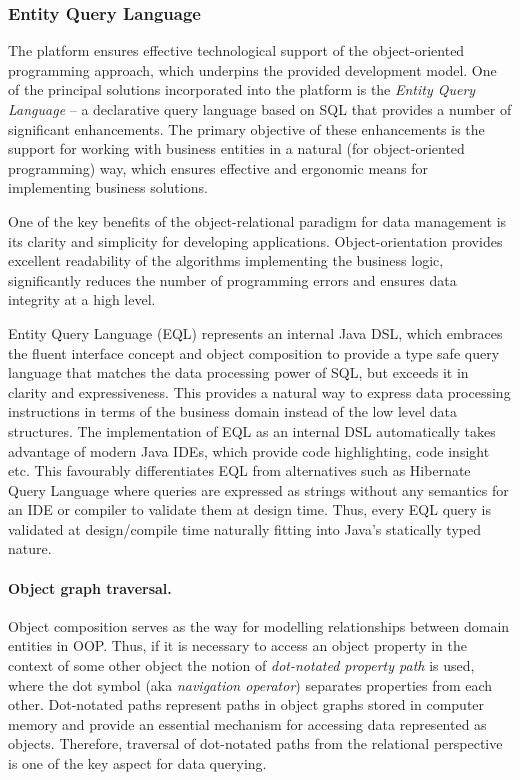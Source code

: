    \subsubsection{Entity Query Language}  
  The platform ensures effective technological support of the object-oriented programming approach, which underpins the provided development model.
  One of the principal solutions incorporated into the platform is the \emph{Entity Query Language} -- a declarative query language based on SQL that provides a number of significant enhancements. 
  The primary objective of these enhancements is the support for working with business entities in a natural (for object-oriented programming) way, which ensures effective and ergonomic means for implementing business solutions.
  
  One of the key benefits of the object-relational paradigm for data management is its clarity and simplicity for developing applications.
  Object-orientation provides excellent readability of the algorithms implementing the business logic, significantly reduces the number of programming errors and ensures data integrity at a high level.
  
  Entity Query Language (EQL) represents an internal Java DSL, which embraces the fluent interface concept and object composition to provide a type safe query language that matches the data processing power of SQL, but exceeds it in clarity and expressiveness.
  This provides a natural way to express data processing instructions in terms of the business domain instead of the low level data structures.
  The implementation of EQL as an internal DSL automatically takes advantage of modern Java IDEs, which provide code highlighting, code insight etc.
  This favourably differentiates EQL from alternatives such as Hibernate Query Language where queries are expressed as strings without any semantics for an IDE or compiler to validate them at design time.
  Thus, every EQL query is validated at design/compile time naturally fitting into Java's statically typed nature.

  \paragraph{Object graph traversal.}
  Object composition serves as the way for modelling relationships between domain entities in OOP.
  Thus, if it is necessary to access an object property in the context of some other object the notion of \emph{dot-notated property path} is used, where the dot symbol (aka \emph{navigation operator}) separates properties from each other.
  Dot-notated paths represent paths in object graphs stored in computer memory and provide an essential mechanism for accessing data represented as objects.
  Therefore, traversal of dot-notated paths from the relational perspective is one of the key aspect for data querying.
  
